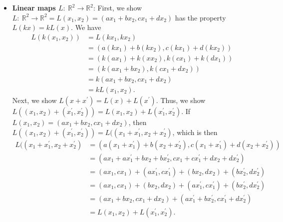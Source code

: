 \documentclass{report}
\begin{document}
\begin{itemize}
        \item \textbf{Linear maps $L:\ \mathbb{R}^{2} \to \mathbb{R}^{2}$}: 
            \bigbreak \noindent 
            First, we show $L:\ \mathbb{R}^{2} \to \mathbb{R}^{2} = L(x_{1}, x_{2}) = (ax_{1} + bx_{2}, cx_{1} + dx_{2})$ has the property $L(kx) = kL(x)$. We have
            \begin{align*}
                L(k(x_{1}, x_{2})) &= L(kx_{1}, kx_{2})  \\
                                   &= (a(kx_{1}) + b(kx_{2}), c(kx_{1}) + d(kx_{2})) \\
                                   &= ( k(ax_{1}) + k(xx_{2}), k(cx_{1}) + k(dx_{1})) \\
                                   &= (k (ax_{1} +  bx_{2}), k(cx_{1} + dx_{2})) \\
                                   &= k(ax_{1} + bx_{2}, c x_{1} + dx_{2}) \\
                                   &=kL(x_{1}, x_{2})
            .\end{align*}
            \bigbreak \noindent 
            Next, we show $L(x + x^{\prime})  =L(x) + L(x^{\prime})$. Thus, we show $L( (x_{1}, x_{2}) + (x^{\prime}_{1}, x^{\prime}_{2})) = L(x_{1}, x_{2}) + L(x^{\prime}_{1}, x^{\prime}_{2})$. If $L(x_{1}, x_{2})  = (ax_{1} + bx_{2}, cx_{1} +  dx_{2})$, then $L( (x_{1}, x_{2}) +  (x^{\prime}_{1}, x^{\prime}_{2})) = L( (x_{1} + x^{\prime}_{1}, x_{2} + x^{\prime}_{2})$, which is then
            \begin{align*}
                L( (x_{1} + x^{\prime}_{1}, x_{2} + x^{\prime}_{2}) &=   (a(x_{1} + x^{\prime}_{1}) + b(x_{2} + x^{\prime}_{2}), c(x_{1} + x^{\prime}_{1}) + d(x_{2} + x^{\prime}_{2}) )\\
                                                                    &= (ax_{1} + ax^{\prime}_{1} + bx_{2} +bx^{\prime}_{2}, cx_{1} + cx^{\prime}_{1} + dx_{2} + dx^{\prime}_{2})  \\
                                                                    &= (ax_{1}, cx_{1}) + (ax^{\prime}_{1}, cx^{\prime}_{1}) + (bx_{2}, dx_{2}) + (bx^{\prime}_{2}, dx^{\prime}_{2}) \\
                                                                    &= (ax_{1}, cx_{1}) + (bx_{2}, dx_{2}) +  (ax^{\prime}_{1}, cx^{\prime}_{1}) + (bx^{\prime}_{2}, dx^{\prime}_{2}) \\
                                                                    &= (ax_{1} + bx_{2}, cx_{1} + dx_{2}) + (ax^{\prime}_{1} + bx^{\prime}_{2}, cx^{\prime}_{1} + dx^{\prime}_{2}) \\
                                                                    &=L(x_{1}, x_{2}) + L(x^{\prime}_{1}, x^{\prime}_{2})
            .\end{align*}
    

\end{itemize}
\end{document}
